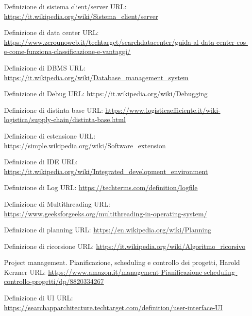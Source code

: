 \begin{enumerate}[label={[\arabic*]}]
    \item \label{client/server} Definizione di sistema client/server URL: \url{https://it.wikipedia.org/wiki/Sistema_client/server}

    \item \label{datacenter} Definizione di data center URL: \url{https://www.zerounoweb.it/techtarget/searchdatacenter/guida-al-data-center-cos-e-come-funziona-classificazione-e-vantaggi/}
    
    \item \label{dbms} Definizione di DBMS URL: \url{https://it.wikipedia.org/wiki/Database_management_system}
    
    \item \label{debug} Definizione di Debug URL: \url{https://it.wikipedia.org/wiki/Debugging}
    
    \item \label{distinta-base} Definizione di distinta base URL: \url{https://www.logisticaefficiente.it/wiki-logistica/supply-chain/distinta-base.html}
    
    \item \label{estensione} Definizione di estensione URL: \url{https://simple.wikipedia.org/wiki/Software_extension}

    \item \label{ide} Definizione di IDE URL: \url{https://it.wikipedia.org/wiki/Integrated_development_environment}
    
    \item \label{log} Definizione di Log URL: \url{https://techterms.com/definition/logfile}

    \item \label{multithread} Definizione di Multithreading URL: \url{https://www.geeksforgeeks.org/multithreading-in-operating-system/}
    
    \item \label{planning} Definizione di planning URL: \url{https://en.wikipedia.org/wiki/Planning}
    
    \item \label{ricorsione} Definizione di ricorsione URL: \url{https://it.wikipedia.org/wiki/Algoritmo_ricorsivo}
    
    \item \label{scheduling2} Project management. Pianificazione, scheduling e controllo dei progetti, Harold Kerzner URL: \url{https://www.amazon.it/management-Pianificazione-scheduling-controllo-progetti/dp/8820334267}
    
    \item \label{UI} Definizione di UI URL: \url{https://searchapparchitecture.techtarget.com/definition/user-interface-UI}
\end{enumerate}